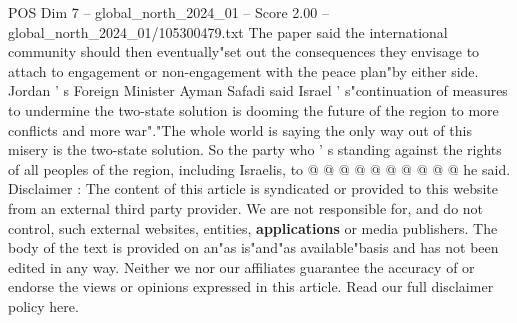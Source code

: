 \begin{textsample}{POS Dim 7 – global\_north\_2024\_01 – Score 2.00 – global\_north\_2024\_01/105300479.txt}
The paper said the international community should then eventually"set out the consequences they envisage to attach to engagement or non-engagement with the peace plan"by either side.
Jordan ' s Foreign Minister Ayman Safadi said Israel ' s"continuation of measures to undermine the two-state solution is dooming the future of the region to more conflicts and more war"."The whole world is saying the only way out of this misery is the two-state solution.
So the party who ' s standing against the rights of all peoples of the region, including Israelis, to @ @ @ @ @ @ @ @ @ @ he said.
Disclaimer : The content of this article is syndicated or provided to this website from an external third party provider.
We are not responsible for, and do not control, such external websites, entities, \textbf{applications} or media publishers.
The body of the text is provided on an"as is"and"as available"basis and has not been edited in any way.
Neither we nor our affiliates guarantee the accuracy of or endorse the views or opinions expressed in this article.
Read our full disclaimer policy here.

\end{textsample}
